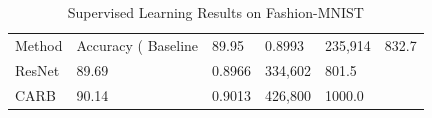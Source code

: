 \begin{table}
\caption{Supervised Learning Results on Fashion-MNIST}
\label{tab:supervised}
\begin{tabular}{lllll}
\toprule
Method & Accuracy (%
\midrule
Baseline & 89.95 & 0.8993 & 235,914 & 832.7 \\
ResNet & 89.69 & 0.8966 & 334,602 & 801.5 \\
CARB & 90.14 & 0.9013 & 426,800 & 1000.0 \\
\bottomrule
\end{tabular}
\end{table}
